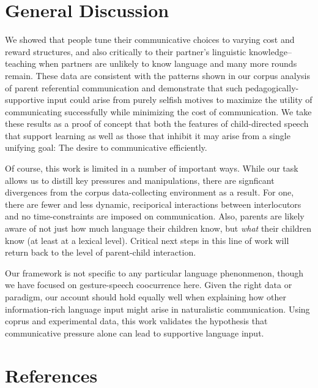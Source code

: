 \documentclass[10pt, letterpaper]{article}
\begin{document}
\hypertarget{general-discussion}{%
\section{General Discussion}\label{general-discussion}}

We showed that people tune their communicative choices to varying cost
and reward structures, and also critically to their partner's linguistic
knowledge--teaching when partners are unlikely to know language and many
more rounds remain. These data are consistent with the patterns shown in
our corpus analysis of parent referential communication and demonstrate
that such pedagogically-supportive input could arise from purely selfish
motives to maximize the utility of communicating successfully while
minimizing the cost of communication. We take these results as a proof
of concept that both the features of child-directed speech that support
learning as well as those that inhibit it may arise from a single
unifying goal: The desire to communicative efficiently.

Of course, this work is limited in a number of important ways. While our
task allows us to distill key pressures and manipulations, there are
signficant divergences from the corpus data-collecting environment as a
result. For one, there are fewer and less dynamic, reciporical
interactions between interlocutors and no time-constraints are imposed
on communication. Also, parents are likely aware of not just how much
language their children know, but \emph{what} their children know (at
least at a lexical level). Critical next steps in this line of work will
return back to the level of parent-child interaction.

Our framework is not specific to any particular language phenonmenon,
though we have focused on gesture-speech coocurrence here. Given the
right data or paradigm, our account should hold equally well when
explaining how other information-rich language input might arise in
naturalistic communication. Using coprus and experimental data, this
work validates the hypothesis that communicative pressure alone can lead
to supportive language input.

\hypertarget{references}{%
\section{References}\label{references}}

\setlength{\parindent}{-0.1in} 
\setlength{\leftskip}{0.125in}
\end{document}
